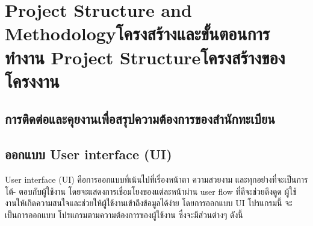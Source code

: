 \chapter{\ifproject%
    \ifenglish Project Structure and Methodology\else โครงสร้างและขั้นตอนการทำงาน\fi
  \else%
    \ifenglish Project Structure\else โครงสร้างของโครงงาน\fi
  \fi
 }

\makeatletter


\makeatother

\section{การติดต่อและคุยงานเพื่อสรุปความต้องการของสำนักทะเบียน}


\section{ออกแบบ User interface (UI)}
User interface (UI) คือการออกแบบที่เน้นไปที่เรื่องหน้าตา ความสวยงาม และทุกอย่างที่จะเป็นการโต้-
ตอบกับผู้ใช้งาน โดยจะแสดงการเชื่อมโยงของแต่ละหน้าผ่าน user flow  ที่ดีจะช่วยดึงดูด
ผู้ใช้งานให้เกิดความสนใจและช่วยให้ผู้ใช้งานเข้าถึงข้อมูลได้ง่าย โดยการออกแบบ UI โปรแกรมนี้ จะเป็นการออกแบบ
โปรแกรมตามความต้องการของผู้ใช้งาน ซึ่งจะมีส่วนต่างๆ ดังนี้

